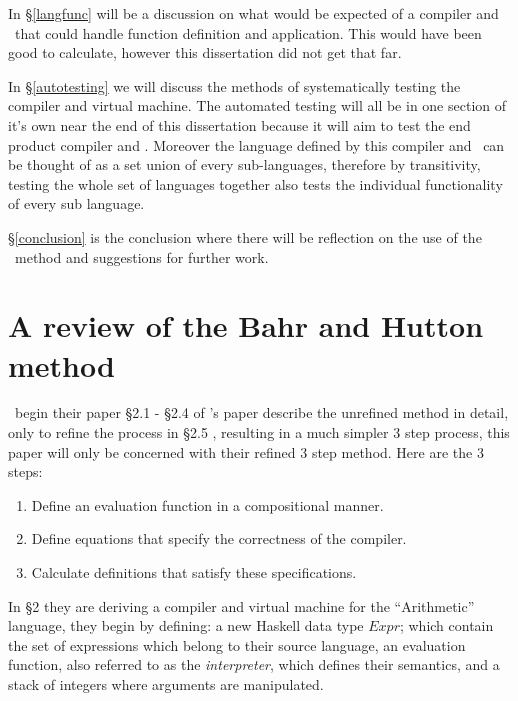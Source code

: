 \documentclass {article}
\begin{document}
In \S\ref{langfunc} will be a discussion on what
would be expected of a compiler and \vm\ that
could handle function definition and application.
This would have been good to calculate, however
this dissertation did not get that far.

In \S\ref{autotesting} we will discuss the methods
of systematically testing the compiler and virtual machine.
The automated testing will all be in one section of it's own
near the end of this dissertation
because it will aim to test the end product compiler and \vm.
Moreover the language defined by this compiler and \vm\
can be thought of as a set union of every sub-languages,
therefore by transitivity, testing 
the whole set of languages together
also tests the individual functionality of every sub language.

\S\ref{conclusion} is the conclusion where there will
be reflection on the use of the \BH\ method and suggestions
for further work.

\pagebreak
\section{A review of the Bahr and Hutton method} \label{bhrev}

\BH\ begin their paper \S2.1 - \S2.4 of \BH's paper describe the unrefined 
method in detail, only to refine the process
in \S2.5 \cite[Combining the transformation steps]{bandh},
resulting in a much simpler 3 step process, 
this paper will only be concerned with
their refined 3 step method\cite[page 12]{bandh}.
Here are the 3 steps:

\begin{enumerate}
	\item Define an evaluation function
		in a compositional manner.
	\item Define equations that specify
		the correctness of the compiler.
	\item Calculate definitions that 
		satisfy these specifications.
\end{enumerate}

In \S2 they are deriving a compiler
and virtual machine for the ``Arithmetic'' language,
they begin by defining: a new Haskell data type $Expr$;
which contain the set of expressions which belong to their source language,
an evaluation function, also referred to as the \emph{interpreter},
which defines their semantics,
and a stack of integers where 
arguments are manipulated.
\newcommand{\eval}{\textit{eval}}
\newcommand{\expr}{\textit{Expr}}
\newcommand{\val}{\textit{Val}}
\newcommand{\add}{\textit{Add}}
\newcommand{\code}{\textit{Code}}
\newcommand{\Val}{\mathit{Val\ }}
\newcommand{\Add}{\mathit{Add\ }}
\newcommand{\evalf}{\mathit{eval\ }}
\newcommand{\Expr}{\mathit{Expr\ }}
\newcommand{\Int}{\mathit{Int\ }}
\end{document}
